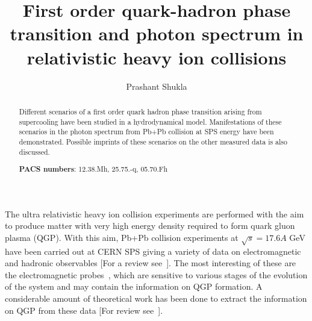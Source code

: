 



\title{First order quark-hadron phase transition
    and photon spectrum in relativistic heavy ion collisions}
\author{Prashant Shukla}
\address{Nuclear Physics Division,\\
 Bhabha Atomic Research Center, Mumbai 400085, India}
\maketitle

\begin{abstract}
 Different scenarios of a first order quark hadron phase transition 
arising from supercooling have been studied in a hydrodynamical 
model. Manifestations of these scenarios in the photon spectrum 
from Pb+Pb collision at SPS energy have been demonstrated.
Possible imprints of these scenarios on the other measured data 
is also discussed.

\vspace{.1in}  
\noindent
{\bf PACS numbers}: 12.38.Mh, 25.75.-q, 05.70.Fh
\end{abstract}




\vspace{.2in}  

  The ultra relativistic heavy ion collision experiments are performed 
with the aim to produce matter with very high energy density required to 
form quark gluon plasma (QGP). With this aim, Pb+Pb collision experiments 
at $\sqrt s = 17.6A$ GeV have been carried out at CERN SPS giving a 
variety of data on electromagnetic and hadronic observables
[For a review see~\cite{ESKOLA}]. 
  The most interesting of these are the electromagnetic 
probes~\cite{WA98,CERES}, 
which are sensitive to various stages of the evolution of the system and 
may contain the information on QGP formation. 
  A considerable amount of theoretical work has been done
to extract the information on QGP from these 
data [For review see~\cite{PEITTHOMA,GALER}].

